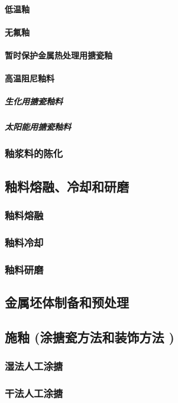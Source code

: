 \documentclass[UTF8]{../../ApplicationUniverse}
\begin{document}
            \paragraph{低温釉}
            \paragraph{无氟釉}
            \paragraph{暂时保护金属热处理用搪瓷釉}
            \paragraph{高温阻尼釉料}
                \subparagraph{生化用搪瓷釉料}
                \subparagraph{太阳能用搪瓷釉料}
        \subsubsection{釉浆料的陈化}
    \subsection{釉料熔融、冷却和研磨}
        \subsubsection{釉料熔融}
        \subsubsection{釉料冷却}
        \subsubsection{釉料研磨}
    \subsection{金属坯体制备和预处理}
    \subsection{施釉 (涂搪瓷方法和装饰方法 )}
        \subsubsection{湿法人工涂搪}
        \subsubsection{干法人工涂搪}
\end{document}
